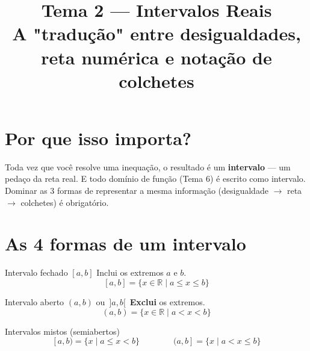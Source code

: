 \documentclass[12pt,a4paper]{article}
\title{\vspace{-1.5cm}\textbf{Tema 2 — Intervalos Reais}\\[2pt]\large A "tradução" entre desigualdades, reta numérica e notação de colchetes}
\author{}
\date{}
\newcommand{\bolaFechada}[1]{\filldraw[blue] (#1,0) circle (2.2pt);}
\newcommand{\bolaAberta}[1]{\draw[blue,fill=white,thick] (#1,0) circle (2.2pt);}
\begin{document}
\maketitle
\thispagestyle{empty}

\section*{Por que isso importa?}
Toda vez que você resolve uma inequação, o resultado é um \textbf{intervalo}
— um pedaço da reta real. E todo domínio de função (Tema 6) é escrito como
intervalo. Dominar as 3 formas de representar a mesma informação
(desigualdade $\to$ reta $\to$ colchetes) é obrigatório.

\section{As 4 formas de um intervalo}

\begin{definicao}{Intervalo fechado $[a,b]$}
Inclui os extremos $a$ e $b$.
\[
[a,b] = \{x \in \mathbb{R} \mid a \le x \le b\}
\]
\begin{center}
\end{center}
\end{definicao}

\begin{definicao}{Intervalo aberto $(a,b)$ ou $\,]a,b[\,$}
\textbf{Exclui} os extremos.
\[
(a,b) = \{x \in \mathbb{R} \mid a < x < b\}
\]
\begin{center}
\end{center}
\end{definicao}

\begin{definicao}{Intervalos mistos (semiabertos)}
\[
[a,b) = \{x \mid a \le x < b\} \qquad\qquad (a,b] = \{x \mid a < x \le b\}
\]
\begin{center}
\end{center}
\end{definicao}
\end{document}
